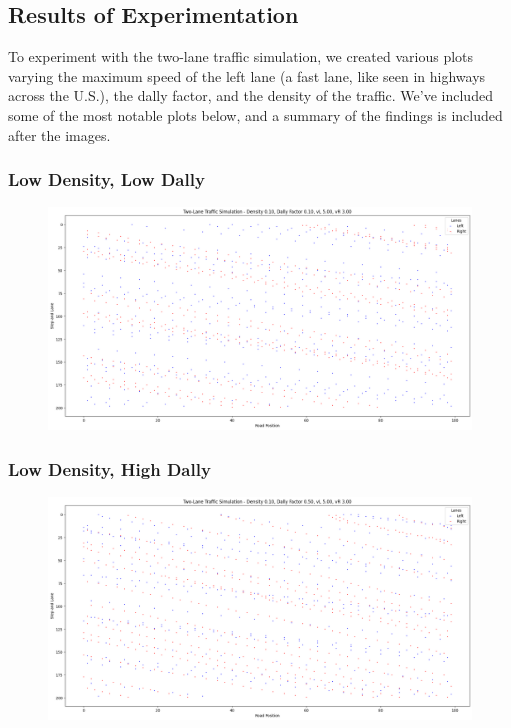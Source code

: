 \documentclass{article}
\begin{document}
\subsection{Results of Experimentation}
To experiment with the two-lane traffic simulation, we created various plots varying the maximum speed of the left lane (a fast lane, like seen in highways across the U.S.), the dally factor, and the density of the traffic. We've included some of the most notable plots below, and a summary of the findings is included after the images. 

\subsubsection{Low Density, Low Dally}
\begin{figure}[!h]
    \centering
    \includegraphics[width=1\linewidth]{assets/two-lane-sim-d0.1-p0.1-vl5-vr3.png}
\end{figure}

\subsubsection{Low Density, High Dally}
\begin{figure}[!h]
    \centering
    \includegraphics[width=1\linewidth]{assets/two-lane-sim-d0.1-p0.5-vl5-vr3.png}
\end{figure}
\end{document}
